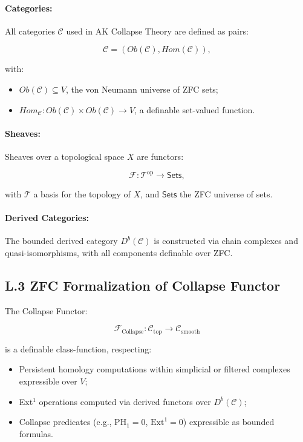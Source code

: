 \documentclass[11pt]{article}
\begin{document}
\paragraph{Categories:}  
All categories \( \mathcal{C} \) used in AK Collapse Theory are defined as pairs:

\[
\mathcal{C} = (Ob(\mathcal{C}), Hom(\mathcal{C})),
\]

with:

\begin{itemize}
    \item \( Ob(\mathcal{C}) \subseteq V \), the von Neumann universe of ZFC sets;
    \item \( Hom_{\mathcal{C}} : Ob(\mathcal{C}) \times Ob(\mathcal{C}) \to V \), a definable set-valued function.
\end{itemize}

\paragraph{Sheaves:}  
Sheaves over a topological space \( X \) are functors:

\[
\mathcal{F} : \mathcal{T}^{\mathrm{op}} \to \mathsf{Sets},
\]

with \( \mathcal{T} \) a basis for the topology of \( X \), and \( \mathsf{Sets} \) the ZFC universe of sets.

\paragraph{Derived Categories:}  
The bounded derived category \( D^b(\mathcal{C}) \) is constructed via chain complexes and quasi-isomorphisms, with all components definable over ZFC.

\subsection*{L.3 ZFC Formalization of Collapse Functor}

The Collapse Functor:

\[
\mathcal{F}_{\mathrm{Collapse}} : \mathcal{C}_{\mathrm{top}} \to \mathcal{C}_{\mathrm{smooth}}
\]

is a definable class-function, respecting:

\begin{itemize}
    \item Persistent homology computations within simplicial or filtered complexes expressible over \( V \);
    \item Ext$^1$ operations computed via derived functors over \( D^b(\mathcal{C}) \);
    \item Collapse predicates (e.g., \( \mathrm{PH}_1 = 0 \), \( \mathrm{Ext}^1 = 0 \)) expressible as bounded formulas.
\end{itemize}
\end{document}
